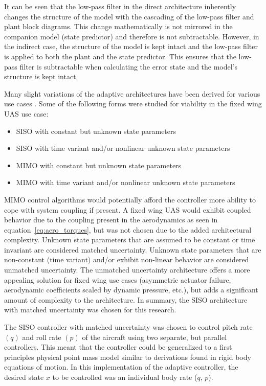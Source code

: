  It can be seen that the low-pass filter in the direct architecture inherently changes the structure of the model with the cascading of the low-pass filter and plant block diagrams.  This change mathematically is not mirrored in the companion model (state predictor) and therefore is not subtractable.  However, in the indirect case, the structure of the model is kept intact and the low-pass filter is applied to both the plant and the state predictor.  This ensures that the low-pass filter is subtractable when calculating the error state and the model's structure is kept intact.

Many slight variations of the \Lone adaptive architectures have been derived for various use cases \cite{hovakimyan2010l1}.  Some of the following forms were studied for viability in the fixed wing \ac{UAS} use case:
\begin{itemize}
	\item \ac{SISO} with constant but unknown state parameters
	\item \ac{SISO} with time variant and/or nonlinear unknown state parameters
	\item \ac{MIMO} with constant but unknown state parameters
	\item \ac{MIMO} with time variant and/or nonlinear unknown state parameters
\end{itemize}

\ac{MIMO} control algorithms would potentially afford the controller more ability to cope with system coupling if present.  A fixed wing \ac{UAS} would exhibit coupled behavior due to the coupling present in the aerodynamics as seen in equation~\ref{eq:aero_torques}, but was not chosen due to the added architectural complexity.  Unknown state parameters that are assumed to be constant or time invariant are considered matched uncertainty.  Unknown state parameters that are non-constant (time variant) and/or exhibit non-linear behavior are considered unmatched uncertainty.  The unmatched uncertainty architecture offers a more appealing solution for fixed wing use cases (asymmetric actuator failure, aerodynamic coefficients scaled by dynamic pressure, etc.), but adds a significant amount of complexity to the architecture.  In summary, the \ac{SISO} architecture with matched uncertainty was chosen for this research.  

The \ac{SISO} controller with matched uncertainty was chosen to control pitch rate $(q)$ and roll rate $(p)$ of the aircraft using two separate, but parallel controllers.  This meant that the controller could be generalized to a first principles physical point mass model similar to derivations found in rigid body equations of motion.  In this implementation of the \Lone adaptive controller, the desired state $x$ to be controlled was an individual body rate (\eg $q$, $p$). 

